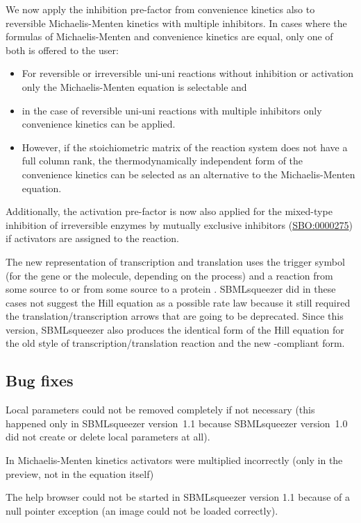 We now apply the inhibition pre-factor from convenience kinetics also to
reversible Michaelis-Menten kinetics with multiple inhibitors. In cases where
the formulas of Michaelis-Menten and convenience kinetics are equal, only one of
both is offered to the user:
\begin{itemize}
\item For reversible or irreversible uni-uni reactions without inhibition or
      activation only the Michaelis-Menten equation is selectable and
\item in the case of reversible uni-uni reactions with multiple inhibitors only
      convenience kinetics can be applied.
\item However, if the stoichiometric matrix of the reaction system does not have
      a full column rank, the thermodynamically independent form of the
      convenience kinetics can be selected as an alternative to the
      Michaelis-Menten equation.
\end{itemize}
Additionally, the activation pre-factor is now also applied for the mixed-type
inhibition of irreversible enzymes by mutually exclusive inhibitors
(\href{identifiers.org/biomodels.sbo/SBO:0000275}{SBO:0000275}) if activators
are assigned to the reaction.

The new \SBGN representation of transcription and translation uses the trigger
symbol (for the gene or the \RNA molecule, depending on the process) and a
reaction from some source to \RNA or from some source to a protein \citep{LeNovere2009}.
SBMLsqueezer did in these cases not suggest the Hill equation as a possible rate law because
it still required the translation/transcription arrows that are going to be
deprecated. Since this version, SBMLsqueezer also produces the identical form of
the Hill equation for the old style of transcription/translation reaction and
the new \SBGN-compliant form.

\subsection{Bug fixes}

Local parameters could not be removed completely if not necessary (this happened
only in SBMLsqueezer version~1.1 because SBMLsqueezer version~1.0 did not create
or delete local parameters at all).

In Michaelis-Menten kinetics activators were multiplied incorrectly (only in the
preview, not in the equation itself)

The help browser could not be started in SBMLsqueezer version 1.1 because of a
null pointer exception (an image could not be loaded correctly).

